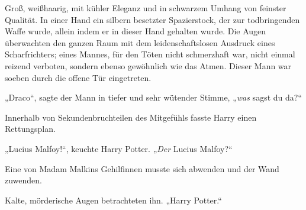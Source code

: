 Groß, weißhaarig, mit kühler Eleganz und in schwarzem Umhang von feinster Qualität. In einer Hand ein silbern besetzter Spazierstock, der zur todbringenden Waffe wurde, allein indem er in dieser Hand gehalten wurde. Die Augen überwachten den ganzen Raum mit dem leidenschaftslosen Ausdruck eines Scharfrichters; eines Mannes, für den Töten nicht schmerzhaft war, nicht einmal reizend verboten, sondern ebenso gewöhnlich wie das Atmen.
Dieser Mann war soeben durch die offene Tür eingetreten.

„Draco“, sagte der Mann in tiefer und sehr wütender Stimme,
„\emph{was} sagst du da?“

Innerhalb von Sekundenbruchteilen des Mitgefühls fasste Harry einen Rettungsplan.

„Lucius Malfoy!“, keuchte Harry Potter.
„\emph{Der} Lucius Malfoy?“

Eine von Madam Malkins Gehilfinnen musste sich abwenden und der Wand zuwenden.

Kalte, mörderische Augen betrachteten ihn.
„Harry Potter.“


